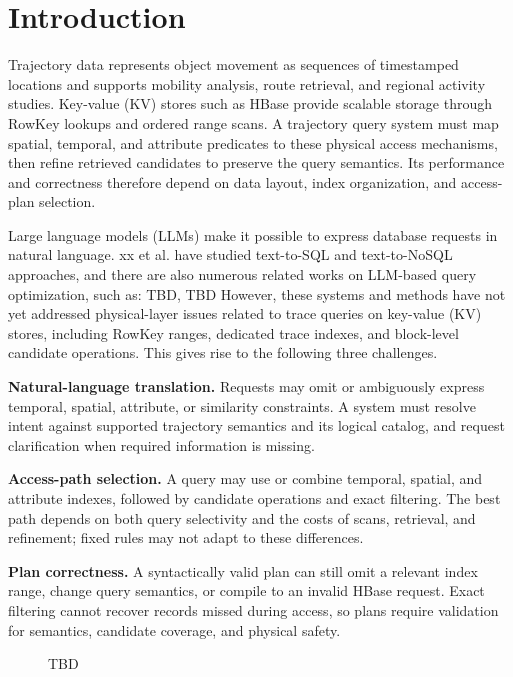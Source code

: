 \section{Introduction}\label{sec:introduction}

Trajectory data represents object movement as sequences of timestamped locations and supports mobility analysis, route retrieval, and regional activity studies.
  Key-value (KV) stores such as HBase provide scalable storage through RowKey lookups and ordered range scans.
  A trajectory query system must map spatial, temporal, and attribute predicates to these physical access mechanisms, then refine retrieved candidates to preserve the query semantics.
  Its performance and correctness therefore depend on data layout, index organization, and access-plan selection.

Large language models (LLMs) make it possible to express database requests in natural language.
xx et al. have studied text-to-SQL and text-to-NoSQL approaches, and there are also numerous related works on LLM-based query optimization, such as: TBD, TBD
However, these systems and methods have not yet addressed physical-layer issues related to trace queries on key-value (KV) stores, including RowKey ranges, dedicated trace indexes, and block-level candidate operations. This gives rise to the following three challenges.

\noindent\textbf{Natural-language translation.} Requests may omit or ambiguously express temporal, spatial, attribute, or similarity constraints.
  A system must resolve intent against supported trajectory semantics and its logical catalog, and request clarification when required information is missing.

\noindent\textbf{Access-path selection.} A query may use or combine temporal, spatial, and attribute indexes, followed by candidate operations and exact filtering.
  The best path depends on both query selectivity and the costs of scans, retrieval, and refinement; fixed rules may not adapt to these differences.

\noindent\textbf{Plan correctness.} A syntactically valid plan can still omit a relevant index range, change query semantics, or compile to an invalid HBase request.
  Exact filtering cannot recover records missed during access, so plans require validation for semantics, candidate coverage, and physical safety.


\begin{figure}[tbp]
\centering
{}
\caption{TBD}
\label{fig:kart-motivation}
\end{figure}

